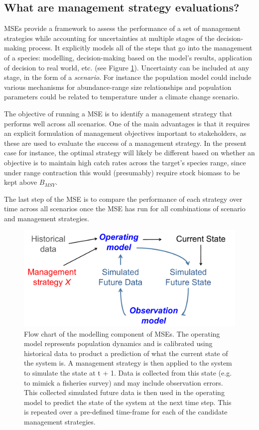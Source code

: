 \documentclass{article}
\begin{document}
\subsection{What are management strategy evaluations?}

MSEs provide a framework to assess
the performance of a set of management strategies while accounting for
uncertainties at multiple stages of the decision-making process. It
explicitly models all of the steps that go into the management of a
species: modelling, decision-making based on the model's results,
application of decision to real world, etc. (see Figure
\ref{msefig}). Uncertainty can be included
at any stage, in the form of a \emph{scenario}. For instance the population model could include various
mechanisms for abundance-range size relationships and population
parameters could be related to temperature under a climate change
scenario.

The objective of running a MSE is to identify a management strategy
that performs well across all scenarios. One of the main advantages is that
it requires an explicit formulation of management objectives important
to stakeholders, as these are used to evaluate the success of a
management strategy. In the present case for instance, the optimal strategy
will likely be different based on whether an objective is to maintain
high catch rates across the target's species range, since under range
contraction this would (presumably) require stock biomass to be kept
above $B_{MSY}$.

The last step of the MSE is to compare the performance of each strategy
over time across all scenarios once the MSE has run for all combinations of
scenario and management strategies.

\begin{figure}
\begin{center}
\includegraphics[scale=0.5]{ResearchProposalSpring2013_MSEdiagram}
\caption{Flow chart of the modelling component of MSEs. The operating
  model represents population dynamics and is calibrated using
  historical data to product a prediction of what the current state of
  the system is. A management strategy is then applied to the system
  to simulate the state at t + 1. Data is collected from this
  state (e.g. to mimick a fisheries survey) and may include
  observation errors. This collected simulated future data is then
  used in the operating model to predict the state of the system at
  the next time step. This is repeated over a pre-defined time-frame
  for each of the candidate management strategies.
\label{msefig}
}
\end{center}
\end{figure}
\end{document}
